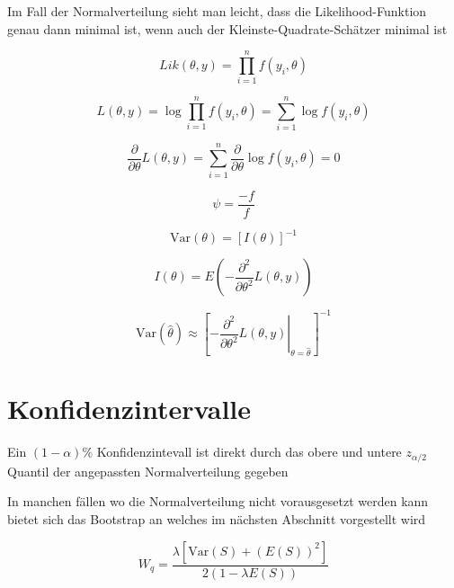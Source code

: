 Im Fall der Normalverteilung sieht man leicht, dass die Likelihood-Funktion genau dann minimal ist, wenn auch der Kleinste-Quadrate-Schätzer minimal ist

\begin{equation}
\mathit{Lik}(\theta, y) = \prod_{i=1}^n f(y_i, \theta)
\end{equation}

\begin{equation}
L(\theta, y) = \log \prod_{i=1}^n f(y_i, \theta) = \sum_{i=1}^n \log f(y_i, \theta)
\end{equation}

\begin{equation}
\frac{\partial}{\partial \theta} L(\theta, y) = \sum_{i=1}^n \frac{\partial}{\partial \theta} \log f(y_i, \theta) = 0
\end{equation}

\begin{equation}
\psi = \frac{ -f }{ f }
\end{equation}

\begin{equation}
\mathrm{Var}(\theta) = \left[ I(\theta) \right]^{-1}
\end{equation}

\begin{equation}
I(\theta) = E \left(- \frac{\partial^2}{\partial \theta^2} L(\theta, y) \right) 
\end{equation}

\begin{equation}
\mathrm{Var}(\hat{\theta}) \approx \left[ \left. - \frac{\partial^2}{\partial \theta^2} L(\theta, y) \right|_{\theta = \hat{\theta}} \right]^{-1}
\end{equation}

\section{Konfidenzintervalle}

Ein $(1- \alpha)\%$ Konfidenzintevall ist direkt durch das obere und untere $z_{\alpha / 2}$ Quantil der angepassten Normalverteilung gegeben

In manchen fällen wo die Normalverteilung nicht vorausgesetzt werden kann bietet sich das Bootstrap an welches im nächsten Abschnitt vorgestellt wird

\begin{equation}
W_q = \frac{
	\lambda \left[ \mathrm{Var}(S) + (E(S))^2 \right]
}{
	2 (1 - \lambda E(S)) 
}
\end{equation}

